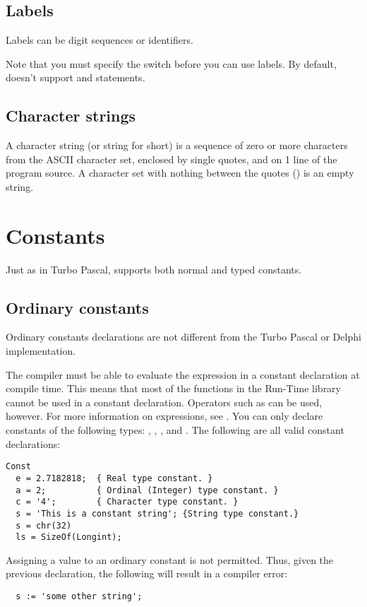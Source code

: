 \documentclass{report}
\begin{document}
\section{Labels}
Labels can be digit sequences or identifiers.

\begin{remark}
Note that you must specify the  switch before you can use labels.
By default, \fpc doesn't support  and  statements.
\end{remark}

\section{Character strings}
A character string (or string for short) is a sequence of zero or more
characters from the ASCII character set, enclosed by single quotes, and on 1
line of the program source.
A character set with nothing between the quotes () is an empty
string.

\chapter{Constants}
Just as in Turbo Pascal, \fpc supports both normal and typed constants.

\section{Ordinary constants}
Ordinary constants declarations are not different from the Turbo Pascal or
Delphi implementation.

The compiler must be able to evaluate the expression in a constant
declaration at compile time.  This means that most of the functions
in the Run-Time library cannot be used in a constant declaration.
Operators such as  can be used, however. For more information on expressions, see
.
You can only declare constants of the following types: ,
, , and .
The following are all valid constant declarations:
\begin{verbatim}
Const
  e = 2.7182818;  { Real type constant. }
  a = 2;          { Ordinal (Integer) type constant. }
  c = '4';        { Character type constant. }
  s = 'This is a constant string'; {String type constant.}
  s = chr(32)
  ls = SizeOf(Longint);
\end{verbatim}
Assigning a value to an ordinary constant is not permitted. 
Thus, given the previous declaration, the following will result 
in a compiler error:
\begin{verbatim}
  s := 'some other string';
\end{verbatim}
\end{document}
